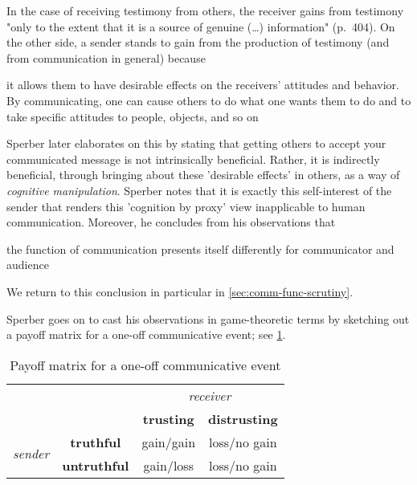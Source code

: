 In the case of receiving testimony from others, the receiver gains from testimony "only to the extent that it is a source of genuine (\ldots) information" (p.~404).
On the other side, a sender stands to gain from the production of testimony (and from communication in general) because
\begin{quoting}
    it allows them to have desirable effects on the receivers' attitudes and behavior. By communicating, one can cause others to do what one wants them to do and to take specific attitudes to people, objects, and so on
\end{quoting}
Sperber later elaborates on this by stating that getting others to accept your communicated message is not intrinsically beneficial. Rather, it is indirectly beneficial, through bringing about these 'desirable effects' in others, as a way of \emph{cognitive manipulation}.
Sperber notes that it is exactly this self-interest of the sender that renders this 'cognition by proxy' view inapplicable to human communication.
Moreover, he concludes from his observations that
\begin{quoting}
    the function of communication presents itself differently for communicator and audience
\end{quoting}
We return to this conclusion in particular in \cref{sec:comm-func-scrutiny}.

Sperber goes on to cast his observations in game-theoretic terms by sketching out a payoff matrix for a one-off communicative event; see \cref{tab:matrix}.

\begin{table}[ht]
    \centering
    \begin{tabular}{ccc|c}
      \cline{3-4}
      & & \multicolumn{2}{c}{\emph{receiver}} \\ \cline{3-4}
      & & \textbf{trusting} & \textbf{distrusting} \\ \hline
      \multirow{2}{*}{\emph{sender}} &
      \textbf{truthful} & gain/gain & loss/no gain \\ \cline{2-4}
      & \textbf{untruthful} & gain/loss & loss/no gain \\ \hline
    \end{tabular}
    \caption{Payoff matrix for a one-off communicative event}
    \label{tab:matrix}
\end{table}

